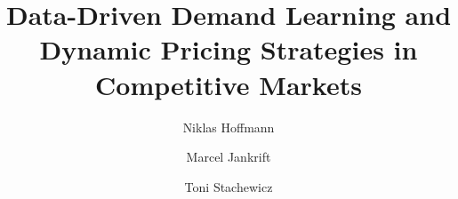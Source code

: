 \documentclass[sigconf]{acmart}
\begin{document}
\title{Data-Driven Demand Learning and Dynamic Pricing Strategies in Competitive Markets} 

\author{Niklas Hoffmann}
\author{Marcel Jankrift} 
\author{Toni Stachewicz}


\maketitle











\end{document}
